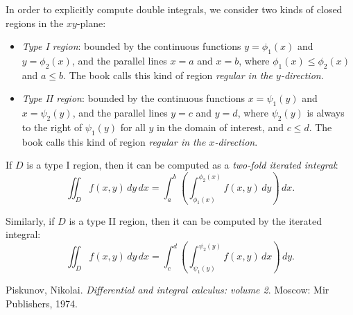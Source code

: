 \documentclass{article}
\begin{document}
In order to explicitly compute double integrals, we consider two kinds of closed regions in the $xy$-plane:
\begin{itemize}
\item \emph{Type I region}: bounded by the continuous functions $y = \phi_1(x)$ and $y = \phi_2(x)$, and the parallel lines $x = a$ and $x = b$, where $\phi_1(x) \leq \phi_2(x)$ and $a \leq b$. The book calls this kind of region \emph{regular in the $y$-direction}.
\item \emph{Type II region}: bounded by the continuous functions $x = \psi_1(y)$ and $x = \psi_2(y)$, and the parallel lines $y = c$ and $y = d$, where $\psi_2(y)$ is always to the right of $\psi_1(y)$ for all $y$ in the domain of interest, and $c \leq d$. The book calls this kind of region \emph{regular in the $x$-direction}.
\end{itemize}

If $D$ is a type I region, then it can be computed as a \emph{two-fold iterated integral}:
$$ \iint_D f(x,y) \, dy \, dx = \int_a^b \left( \int_{\phi_1(x)}^{\phi_2(x)} f(x,y) \, dy \right) \, dx.$$

Similarly, if $D$ is a type II region, then it can be computed by the iterated integral:
$$ \iint_D f(x,y) \, dy \, dx = \int_c^d \left( \int_{\psi_1(y)}^{\psi_2(y)} f(x,y) \, dx \right) \, dy.$$







\begin{thebibliography}{9}

Piskunov, Nikolai. \textit{Differential and integral calculus: volume 2}. Moscow: Mir Publishers, 1974.

  
\end{thebibliography}
\end{document}
